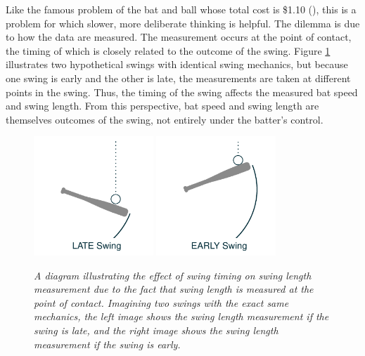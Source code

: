 \documentclass{article}
\begin{document}
    Like the famous problem of the bat and ball whose total cost is \$1.10 (\cite{kahneman_thinking_2011}), this is a problem for which slower, more deliberate thinking is helpful. The dilemma is due to how the data are measured. The measurement occurs at the point of contact, the timing of which is closely related to the outcome of the swing. Figure \ref{fig:swing-diagram} illustrates two hypothetical swings with identical swing mechanics, but because one swing is early and the other is late, the measurements are taken at different points in the swing. Thus, the timing of the swing affects the measured bat speed and swing length. From this perspective, bat speed and swing length are themselves outcomes of the swing, not entirely under the batter's control.

    \begin{figure}
      \centering
      \includegraphics[width = 0.4\textwidth]{../../figures/swing_late.pdf}
      \includegraphics[width = 0.4\textwidth]{../../figures/swing_early.pdf}
      \caption{\it A diagram illustrating the effect of swing timing on swing length measurement due to the fact that swing length is measured at the point of contact. Imagining two swings with the exact same mechanics, the left image shows the swing length measurement if the swing is late, and the right image shows the swing length measurement if the swing is early.}
      \label{fig:swing-diagram}
    \end{figure}
\end{document}
